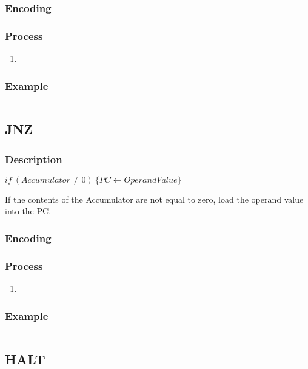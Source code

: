     \subsubsection{Encoding}
    \subsubsection{Process}
    \begin{enumerate}
        \item
    \end{enumerate}

    \subsubsection{Example}
    \begin{verbatim}
    \end{verbatim}

\subsection{JNZ}\label{subsec:jnz}
    \subsubsection{Description}
    $if\ (Accumulator \neq 0)\ \{ PC \leftarrow OperandValue \}$
    \par If the contents of the Accumulator are not equal to zero, load the operand value into the PC\@.
    \subsubsection{Encoding}
    \subsubsection{Process}
    \begin{enumerate}
        \item
    \end{enumerate}

    \subsubsection{Example}
    \begin{verbatim}
    \end{verbatim}

\subsection{HALT}\label{subsec:halt}
